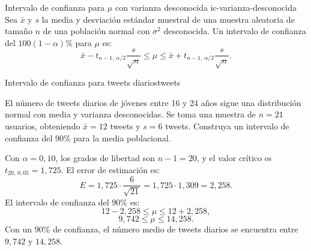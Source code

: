 \documentclass[12pt, a4paper]{book}
\numberwithin{equation}{chapter}
\begin{document}
\begin{definicion}{Intervalo de confianza
		para $\mu$ con varianza desconocida}
	{ic-varianza-desconocida}
	Sea $\bar{x}$ y $s$ la media y
	desviaci\'{o}n est\'{a}ndar muestral
	de una muestra aleatoria de tama\~{n}o
	$n$ de una poblaci\'{o}n normal con
	$\sigma^2$ desconocida. Un intervalo
	de confianza del $100(1-\alpha)\%$
	para $\mu$ es:
	\[
	\bar{x} - t_{n-1,\,\alpha/2}
	\frac{s}{\sqrt{n}}
	\leq \mu \leq
	\bar{x} + t_{n-1,\,\alpha/2}
	\frac{s}{\sqrt{n}}.
	\]
\end{definicion}

\begin{ejemplo}{Intervalo de confianza para
		tweets diarios}{tweets}
	
	El n\'{u}mero de tweets diarios de j\'{o}venes
	entre 16 y 24 a\~{n}os sigue una distribuci\'{o}n
	normal con media y varianza desconocidas.
	Se toma una muestra de $n = 21$ usuarios,
	obteniendo $\bar{x} = 12$ tweets y
	$s = 6$ tweets. Construya un intervalo
	de confianza del $90\%$ para la media
	poblacional.
	
	\medskip
	Con $\alpha = 0{,}10$, los grados de
	libertad son $n - 1 = 20$, y el valor
	cr\'{i}tico es $t_{20,\,0{,}05} = 1{,}725$.
	El error de estimaci\'{o}n es:
	\[
	E = 1{,}725 \cdot
	\frac{6}{\sqrt{21}}
	= 1{,}725 \cdot 1{,}309
	= 2{,}258.
	\]
	El intervalo de confianza del $90\%$ es:
	\[
	12 - 2{,}258
	\leq \mu \leq
	12 + 2{,}258,
	\]
	\[
	9{,}742 \leq \mu \leq 14{,}258.
	\]
	Con un $90\%$ de confianza, el n\'{u}mero
	medio de tweets diarios se encuentra entre
	$9{,}742$ y $14{,}258$.
	
\end{ejemplo}
\end{document}
